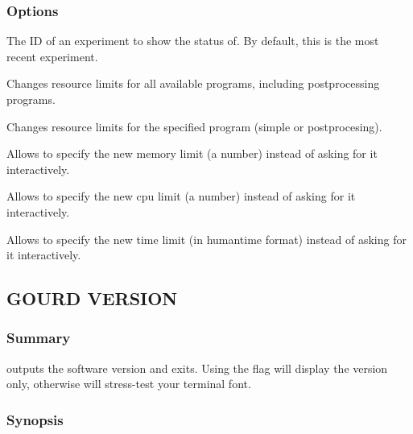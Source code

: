 \documentclass[a4paper,english]{article}
\begin{document}
\begin{adjustwidth}{18pt}{0pt}
            \subsubsection{Options}
                \begin{Description}[Options]
                    \item[\Arg{experiment-id}]
                    The ID of an experiment to show the status of.
                    By default, this is the most recent experiment.
                    \item[\Opt{-a, --all}]
                    Changes resource limits for all available programs, including postprocessing programs.
                    \item[\OptArg{-p, --program}{ program-name}]
                    Changes resource limits for the specified program (simple or postprocesing).
                    \item[\Opt{--mem}]
                    Allows to specify the new memory limit (a number) instead of asking for it interactively.
                    \item[\Opt{--cpu}]
                    Allows to specify the new cpu limit (a number) instead of asking for it interactively.
                    \item[\Opt{--time}]
                    Allows to specify the new time limit (in humantime format) instead of asking for it 
                    interactively.
                \end{Description}

        \subsection{GOURD VERSION}

            \subsubsection{Summary}
                  outputs the software version and exits.
                Using the  flag will display the version only, otherwise 
                will stress-test your terminal font.

            \subsubsection{Synopsis}
                  


\end{adjustwidth}
\end{document}
